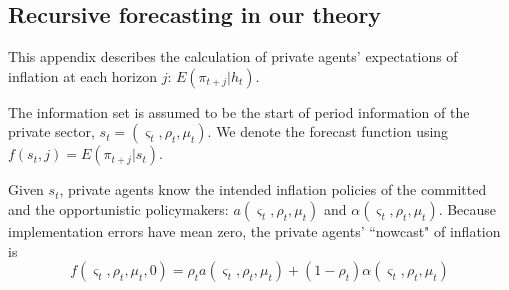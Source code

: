 \documentclass[12pt,letter,leqno]{article}
\theoremstyle{asn}
\theoremstyle{lem}
\theoremstyle{slem}
\theoremstyle{prop}
\theoremstyle{appprop}
\theoremstyle{rem}
\theoremstyle{defn}
\begin{document}
\subsection{Recursive forecasting in our theory}\label{app:forecast}
This appendix describes the calculation of private agents' expectations of inflation at each horizon $j$: $E(\pi_{t+j}|h_t)$.

The information set is assumed to be the start of period information of the
private sector, $s_t=(\varsigma _{t},\rho _{t},\mu_{t})$. We denote the forecast function using $f(s_t,j)=E(\pi_{t+j}|s_t)$.

Given $s_t$, private agents know the intended inflation policies of the committed and the opportunistic policymakers: $a(\varsigma _{t},\rho _{t},\mu_{t})$ and $\alpha (\varsigma _{t},\rho _{t},\mu_{t})$.
Because implementation errors have mean zero, the private agents' ``nowcast" of inflation is 
\[
f(\varsigma _{t},\rho _{t},\mu_{t},0) =\rho _{t}a(\varsigma _{t},\rho _{t},\mu_{t})+(1-\rho _{t})\alpha (\varsigma _{t},\rho _{t},\mu_{t})
\]
\end{document}
